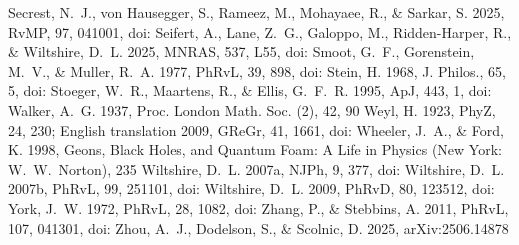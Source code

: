 \documentclass[twocolumn]{aastex701}
\begin{document}
\begin{thebibliography}{}
 Secrest, N.~J., von Hausegger, S., Rameez, M., Mohayaee, R., \& Sarkar, S. 2025, RvMP, 97, 041001, doi:
 Seifert, A., Lane, Z.~G., Galoppo, M., Ridden-Harper, R., \& Wiltshire, D.~L. 2025, MNRAS, 537, L55, doi:
 Smoot, G.~F., Gorenstein, M.~V., \& Muller, R.~A. 1977, PhRvL, 39, 898, doi:
 Stein, H. 1968, J. Philos., 65, 5, doi:
 Stoeger, W.~R., Maartens, R., \& Ellis, G.~F.~R. 1995, ApJ, 443, 1, doi:
 Walker, A.~G. 1937, Proc. London Math. Soc. (2), 42, 90
 Weyl, H. 1923, PhyZ, 24, 230; English translation 2009, GReGr, 41, 1661, doi:
 Wheeler, J.~A., \& Ford, K. 1998, Geons, Black Holes, and Quantum Foam: A Life in Physics (New York: W.~W.~Norton), 235
 Wiltshire, D.~L. 2007a, NJPh, 9, 377, doi:
 Wiltshire, D.~L. 2007b, PhRvL, 99, 251101, doi:
 Wiltshire, D.~L. 2009, PhRvD, 80, 123512, doi:
 York, J.~W. 1972, PhRvL, 28, 1082, doi:
 Zhang, P., \& Stebbins, A. 2011, PhRvL, 107, 041301, doi:
 Zhou, A.~J., Dodelson, S., \& Scolnic, D. 2025, arXiv:2506.14878

\end{thebibliography}
\end{document}
